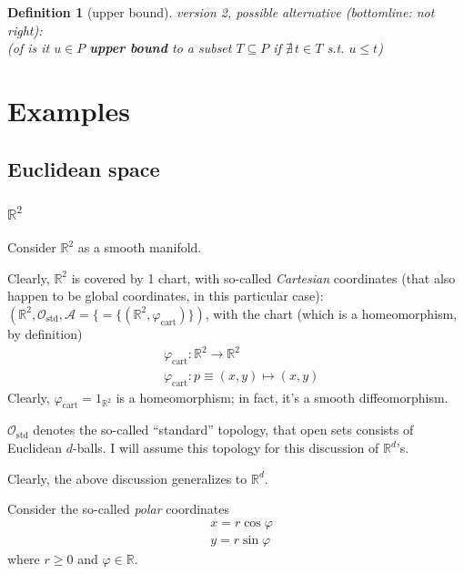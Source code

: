 \documentclass[10pt]{amsart}
\newtheorem{definition}{Definition}
\begin{document}
\begin{multicols*}{2}
\begin{definition}[upper bound]
version 2, possible alternative (bottomline: not right): \\
(of is it $u\in P$ \textbf{upper bound} to a subset $T \subseteq P$ if $\nexists \, t\in T$ s.t. $u\leq t$)

\end{definition}

\section{Examples}

\subsection{Euclidean space}

\subsubsection{$\mathbb{R}^2$}

Consider $\mathbb{R}^2$ as a smooth manifold.  

Clearly, $\mathbb{R}^2$ is covered by 1 chart, with so-called \emph{Cartesian} coordinates (that also happen to be global coordinates, in this particular case): $(\mathbb{R}^2, \mathcal{O}_{\text{std}}, \mathcal{A} = \lbrace = \lbrace (\mathbb{R}^2, \varphi_{\text{cart}} ) \rbrace )$, with the chart (which is a homeomorphism, by definition)
\[
\begin{aligned}
	& \varphi_{\text{cart}} : \mathbb{R}^2 \to \mathbb{R}^2 \\ 
	& \varphi_{\text{cart}} : p \equiv (x,y) \mapsto (x,y)
\end{aligned}
\]
Clearly, $\varphi_{\text{cart}} = 1_{\mathbb{R}^2}$ is a homeomorphism; in fact, it's a smooth diffeomorphism.  

$\mathcal{O}_{\text{std}}$ denotes the so-called ``standard'' topology, that open sets consists of Euclidean $d$-balls.  I will assume this topology for this discussion of $\mathbb{R}^d$'s.  

Clearly, the above discussion generalizes to $\mathbb{R}^d$.  

Consider the so-called \emph{polar} coordinates 
\begin{equation}\label{Eq:R2polarcoordinates}
	\begin{aligned}
		& x = r\cos{\varphi} \\ 
		& y = r\sin{\varphi}
	\end{aligned}
\end{equation}
where $r\geq 0$ and $\varphi \in \mathbb{R}$.  


\end{multicols*}
\end{document}
